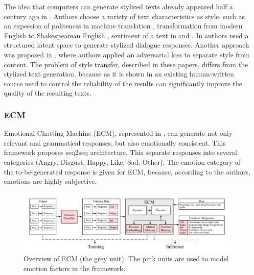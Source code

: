 The idea that computers can generate stylized texts already appeared half a century ago in \cite{wheatley1965computer}. Authors choose a variety of text characteristics as style, such as an expession of politeness in machine translation \cite{sennrich2016controlling}, transformation from modern English to Shakespearean English \cite{jhamtani2017shakespearizing}, sentiment of a text in \cite{shen2017style} and \cite{li2018delete}. In \cite{gao2019structuring} authors used a structured latent space to generate stylized dialogue responses. Another approach was proposed in \cite{john2018disentangled}, where authors applied an adversarial loss to separate style from content. The problem of style transfer, described in these papers, differs from the stylized text generation, because as it is shown in \cite{guu2018generating} an existing human-written source used to control the reliability of the results can significantly improve the quality of the resulting texts. 

\subsubsection{ECM}
Emotional Chatting Machine (ECM), represented in \cite{zhou2018emotional}, can generate not only relevant and grammatical responses, but also emotionally consistent. This framework proposes seq2seq architecture. This separate responses into several categories (Angry, Disgust, Happy, Like, Sad, Other). The emotion category of the to-be-generated response is given for ECM, because, according to the authors, emotions are highly subjective. 

\begin{figure}[hbt]
  \centering
  \includegraphics[width=1\textwidth]{figures/ecm.png}
  \caption{ Overview of ECM (the grey unit). The pink units are used to model emotion factors in the framework.}
  \label{ecm}
\end{figure}

